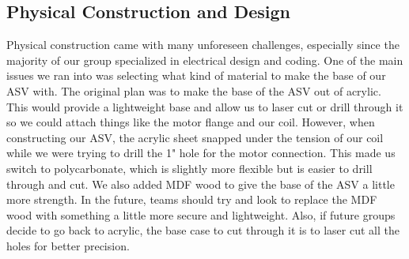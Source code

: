 \subsection{Physical Construction and Design}
Physical construction came with many unforeseen challenges, especially since the majority of our group specialized in electrical design and coding. One of the main issues we ran into was selecting what kind of material to make the base of our ASV with. The original plan was to make the base of the ASV out of acrylic. This would provide a lightweight base and allow us to laser cut or drill through it so we could attach things like the motor flange and our coil. However, when constructing our ASV, the acrylic sheet snapped under the tension of our coil while we were trying to drill the 1" hole for the motor connection. This made us switch to polycarbonate, which is slightly more flexible but is easier to drill through and cut. We also added MDF wood to give the base of the ASV a little more strength. In the future, teams should try and look to replace the MDF wood with something a little more secure and lightweight. Also, if future groups decide to go back to acrylic, the base case to cut through it is to laser cut all the holes for better precision. 